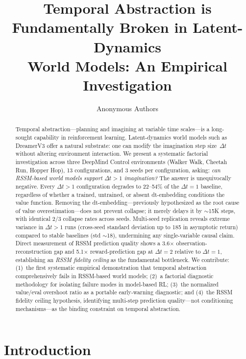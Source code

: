 \documentclass[10pt,letterpaper]{article}
\title{Temporal Abstraction is Fundamentally Broken in Latent-Dynamics\\World Models: An Empirical Investigation}
\author{
  Anonymous Authors
}
\date{}
\newcommand{\dt}{\Delta t}
\begin{document}
\maketitle

\begin{abstract}
Temporal abstraction---planning and imagining at variable time scales---is a long-sought capability in reinforcement learning.
Latent-dynamics world models such as DreamerV3 offer a natural substrate: one can modify the imagination step size~$\dt$ without altering environment interaction.
We present a systematic factorial investigation across three DeepMind Control environments (Walker Walk, Cheetah Run, Hopper Hop), 13 configurations, and 3 seeds per configuration, asking: \emph{can RSSM-based world models support $\dt>1$ imagination?}
The answer is unequivocally negative.
Every $\dt>1$ configuration degrades to 22--54\% of the $\dt=1$ baseline, regardless of whether a trained, untrained, or absent dt-embedding conditions the value function.
Removing the dt-embedding---previously hypothesized as the root cause of value overestimation---does not prevent collapse; it merely delays it by $\sim$15K steps, with identical 2/3 collapse rates across seeds.
Multi-seed replication reveals extreme variance in $\dt>1$ runs (cross-seed standard deviation up to 185 in asymptotic return) compared to stable baselines (std $\sim$18), undermining any single-variable causal claim.
Direct measurement of RSSM prediction quality shows a 3.6$\times$ observation-reconstruction gap and 5.1$\times$ reward-prediction gap at $\dt=2$ relative to $\dt=1$, establishing an \emph{RSSM fidelity ceiling} as the fundamental bottleneck.
We contribute: (1)~the first systematic empirical demonstration that temporal abstraction comprehensively fails in RSSM-based world models; (2)~a factorial diagnostic methodology for isolating failure modes in model-based RL; (3)~the normalized value/eval overshoot ratio as a portable early-warning diagnostic; and (4)~the RSSM fidelity ceiling hypothesis, identifying multi-step prediction quality---not conditioning mechanisms---as the binding constraint on temporal abstraction.
\end{abstract}

\section{Introduction}\label{sec:intro}
\end{document}
